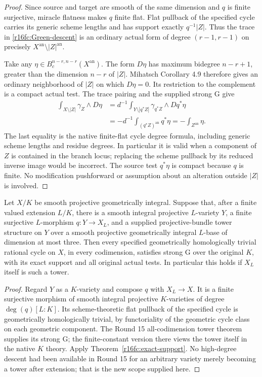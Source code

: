 \begin{proof}
Since source and target are smooth of the same dimension and $q$ is
finite surjective, miracle flatness makes $q$ finite flat. Flat
pullback of the specified cycle carries its generic scheme lengths and
has support exactly $q^{-1}|Z|$. Thus the trace in
\eqref{r16fc:Green-descent} is an ordinary actual form of degree
$(r-1,r-1)$ on precisely $X^{\mathrm{an}}\setminus|Z|^{\mathrm{an}}$.

Take any $\eta\in B_c^{n-r,n-r}(X^{\mathrm{an}})$. The form $D\eta$
has maximum bidegree $n-r+1$, greater than the dimension $n-r$ of
$|Z|$. Mihatsch Corollary 4.9 therefore gives an ordinary neighborhood
of $|Z|$ on which $D\eta=0$. Its restriction to the complement is a
compact actual test. The trace pairing and the supplied strong G give
\[
\begin{split}
 \int_{X\setminus|Z|}\gamma_Z\wedge D\eta
 &=d^{-1}\int_{Y\setminus|q^*Z|}\gamma_{q^*Z}\wedge Dq^*\eta\\
 &=-d^{-1}\int_{(q^*Z)^{\mathrm{an}}}q^*\eta
 =-\int_{Z^{\mathrm{an}}}\eta.
\end{split}
 \tag{FD16.2}\label{r16fc:Green-pairing}
\]
The last equality is the native finite-flat cycle degree formula,
including generic scheme lengths and residue degrees. In particular
it is valid when a component of $Z$ is contained in the branch locus;
replacing the scheme pullback by its reduced inverse image would be
incorrect. The source test $q^*\eta$ is compact because $q$ is finite.
No modification pushforward or assumption about an alteration outside
$|Z|$ is involved.
\end{proof}

\begin{corollary}
\label{r16fc:twisted-towers}
Let $X/K$ be smooth projective geometrically integral. Suppose that,
after a finite valued extension $L/K$, there is a smooth integral
projective $L$-variety $Y$, a finite surjective $L$-morphism
$q:Y\to X_L$, and a supplied projective-bundle tower structure on $Y$
over a smooth projective geometrically integral $L$-base of dimension
at most three. Then every specified geometrically homologically trivial
rational cycle on $X$, in every codimension, satisfies strong G over
the original $K$, with its exact support and all original actual tests.
In particular this holds if $X_L$ itself is such a tower.
\end{corollary}

\begin{proof}
Regard $Y$ as a $K$-variety and compose $q$ with $X_L\to X$. It is a
finite surjective morphism of smooth integral projective $K$-varieties
of degree $\deg(q)[L:K]$. Its scheme-theoretic flat pullback of the
specified cycle is geometrically homologically trivial, by functoriality
of the geometric cycle class on each geometric component. The Round 15
all-codimension tower theorem supplies its strong G; the finite-constant
version there views the tower itself in the native $K$ theory. Apply
Theorem~\ref{r16fc:exact-support}. No high-degree descent had been
available in Round 15 for an arbitrary variety merely becoming a tower
after extension; that is the new scope supplied here.
\end{proof}

